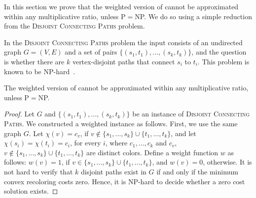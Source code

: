 \label{sec:hard}

In this section we prove that the weighted version of \TWOCR{} cannot
be approximated within any multiplicative ratio, unless P$=$NP.  We
do so using a simple reduction from the 
\textsc{Disjoint Connecting Paths} problem.

In the \textsc{Disjoint Connecting Paths} problem the input consists
of an undirected graph $G=(V,E)$ and a set of pairs $\{(s_1,
t_1), \ldots, (s_k, t_k)\}$, and the question is whether there are $k$
vertex-disjoint paths that connect $s_i$ to $t_i$.  This problem is
known to be NP-hard~\cite{karp1972reducibility}.

\begin{theorem}
The weighted version of \TWOCR{} cannot be approximated within any
 multiplicative ratio, unless P$=$NP.
\end{theorem}
\begin{proof}
Let $G$ and $\{(s_1, t_1), \ldots, (s_k, t_k)\}$ be an instance
of \textsc{Disjoint Connecting Paths}.  We constructed a
weighted \TWOCR{} instance as follows.  First, we use the same graph
$G$.  Let $\chi(v) = c_v$, if
$v \notin \{s_1,\ldots,s_k\} \cup \{t_1,\ldots,t_k\}$, and let
$\chi(s_i) = \chi(t_i) = c_i$, for every $i$, where $c_1, \ldots, c_k$
and $c_v$, $v \notin \{s_1,\ldots,s_k\} \cup \{t_1,\ldots,t_k\}$ are distinct colors.
%
Define a weight function $w$ as follows: $w(v) = 1$, if
$v \in \{s_1,\ldots,s_k\} \cup \{t_1,\ldots,t_k\}$, and $w(v) = 0$,
otherwise.
%
It is not hard to verify that $k$ disjoint paths exist in $G$ if and
only if the minimum convex recoloring costs zero.  Hence, it is
NP-hard to decide whether a zero cost solution exists.
\end{proof}
